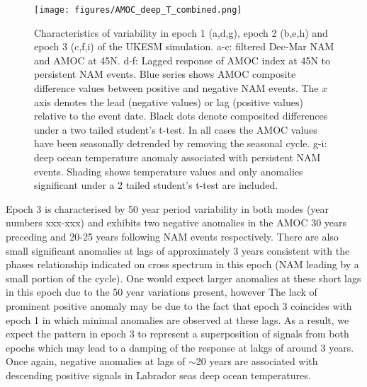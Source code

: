 \begin{center}
\begin{figure}[h!]
\noindent\texttt{[image: figures/AMOC\_deep\_T\_combined.png]}
\caption{Characteristics of variability in epoch 1 (a,d,g), epoch 2 (b,e,h) and epoch 3 (c,f,i) of the UKESM simulation. a-c: filtered Dec-Mar NAM and AMOC at 45N. d-f: Lagged response of AMOC index at 45N to persistent NAM events. Blue series shows AMOC composite difference values between positive and negative NAM events. The $x$ axis denotes the lead (negative values) or lag (positive values) relative to the event date. Black dots denote composited differences under a two tailed student's t-test. In all cases the AMOC values have been seasonally detrended by removing the seasonal cycle.
g-i: deep ocean temperature anomaly associated with persistent NAM events. Shading shows temperature values and only anomalies significant under a 2 tailed student's t-test are included.}
\label{epoch_composites_combined}
\end{figure}
\end{center}

Epoch 3 is characterised by 50 year period variability in both modes (year numbers xxx-xxx) and exhibits two negative anomalies in the AMOC 30 years preceding and 20-25 years following NAM events respectively. There are also small significant anomalies at lags of approximately 3 years consistent with the phases relationship indicated on cross spectrum in this epoch (NAM leading by a small portion of the cycle). One would expect larger anomalies at these short lags in this epoch due to the 50 year variations present, however The lack of prominent positive anomaly may be due to the fact that epoch 3 coincides with epoch 1 in which minimal anomalies are observed at these lags. As a result, we expect the pattern in epoch 3 to represent a superposition of signals from both epochs which may lead to a damping of the response at lakgs of around 3 years. Once again, negative anomalies at lags of $\sim$20 years are associated with descending positive signals in Labrador seas deep ocean temperatures. 

